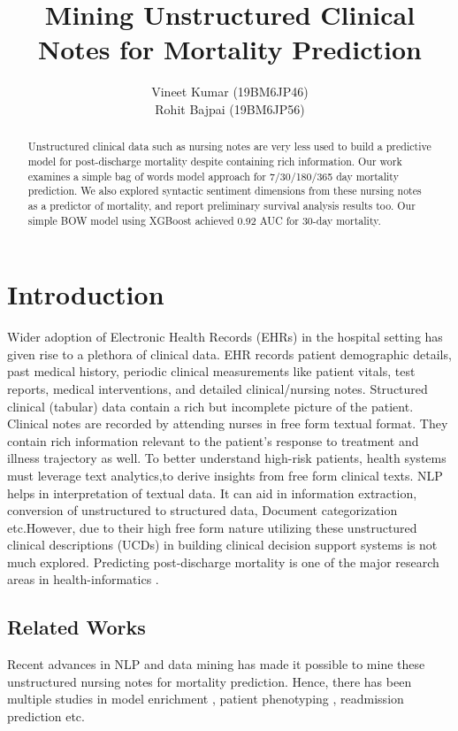 \documentclass[11pt,a4paper]{article}
\title{Mining Unstructured Clinical Notes for Mortality Prediction}
\author{Vineet Kumar (19BM6JP46) \\Rohit Bajpai (19BM6JP56)}
\begin{document}
	\maketitle
\onehalfspacing
\begin{abstract}
\noindent	Unstructured clinical data such as nursing notes
	are very less used to build a predictive model for
	post-discharge mortality despite containing rich
	information. Our work examines a simple bag of
	words model approach for 7/30/180/365 day mortality prediction. We also explored syntactic sentiment dimensions from these nursing notes as
	a predictor of mortality, and report preliminary
	survival analysis results too. Our simple BOW model
	using XGBoost achieved 0.92 AUC for 30-day
	mortality.
\end{abstract}


\section{Introduction}
Wider adoption of Electronic Health Records (EHRs) in the hospital setting has given rise to a plethora of clinical data. EHR records patient demographic details, past medical history, periodic clinical measurements like patient vitals, test reports, medical interventions, and detailed clinical/nursing notes. Structured clinical (tabular) data contain a rich but incomplete picture of the patient. Clinical notes are recorded by attending nurses in free form textual format. They contain rich information relevant to the patient's response to treatment and illness trajectory as well. To better understand high-risk patients, health systems must leverage text analytics,to derive insights from
free form clinical texts. NLP helps in interpretation of textual
data. It can aid in information extraction, conversion of unstructured to structured data, Document
categorization etc.However, due to their high free form nature utilizing these unstructured clinical descriptions (UCDs) in building clinical decision support systems is not much explored. Predicting post-discharge mortality is one of the major
research areas in health-informatics \cite{metersky2012predictors}.

\subsection{Related Works}

Recent advances in NLP and data mining has made it possible
to mine these unstructured nursing notes for mortality prediction. Hence, there has been multiple studies in model enrichment \cite{staff2013can}, patient phenotyping \cite{gehrmann2017comparing}, readmission prediction \cite{shin2019multimodal} etc.
\end{document}
